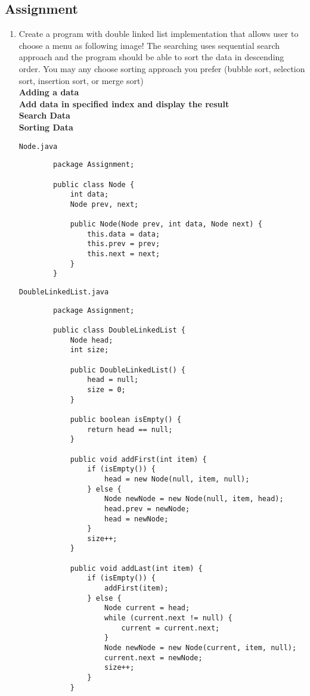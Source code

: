 \documentclass[12pt,titlepage]{article}
\begin{document}
\subsection{Assignment}
\begin{enumerate} 
    \item Create a program with double linked list implementation that allows user to choose a menu as following image! The searching uses sequential search approach and the program should be able to sort the data in descending order. You may any choose sorting approach you prefer (bubble sort, selection sort, insertion sort, or merge sort)
    \hbox{}\\\textbf{Adding a data}
    \hbox{}\\\textbf{Add data in specified index and display the result}
    \hbox{}\\\textbf{Search Data}
    \hbox{}\\\textbf{Sorting Data}
    
    \texttt{Node.java}
    \begin{verbatim}
        package Assignment;

        public class Node {
            int data;
            Node prev, next;

            public Node(Node prev, int data, Node next) {
                this.data = data;
                this.prev = prev;
                this.next = next;
            }
        }
    \end{verbatim}

    \texttt{DoubleLinkedList.java}
    \begin{verbatim}
        package Assignment;

        public class DoubleLinkedList {
            Node head;
            int size;

            public DoubleLinkedList() {
                head = null;
                size = 0;
            }

            public boolean isEmpty() {
                return head == null;
            }

            public void addFirst(int item) {
                if (isEmpty()) {
                    head = new Node(null, item, null);
                } else {
                    Node newNode = new Node(null, item, head);
                    head.prev = newNode;
                    head = newNode;
                }
                size++;
            }

            public void addLast(int item) {
                if (isEmpty()) {
                    addFirst(item);
                } else {
                    Node current = head;
                    while (current.next != null) {
                        current = current.next;
                    }
                    Node newNode = new Node(current, item, null);
                    current.next = newNode;
                    size++;
                }
            }


\end{verbatim}
\end{enumerate}
\end{document}
